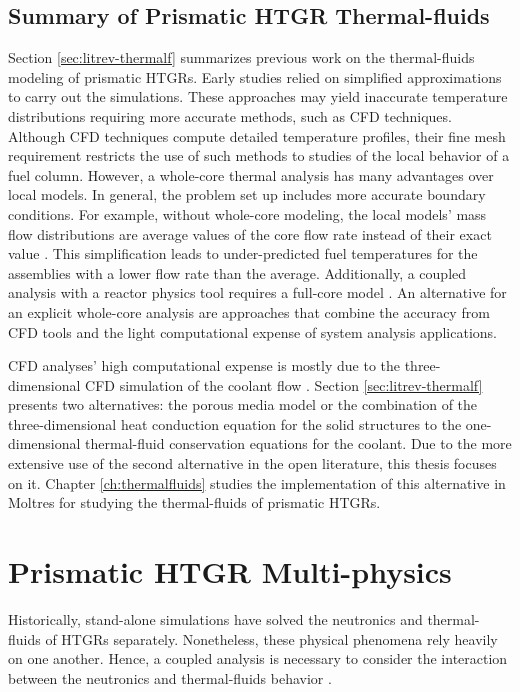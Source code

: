 \subsection{Summary of Prismatic HTGR Thermal-fluids}

Section \ref{sec:litrev-thermalf} summarizes previous work on the thermal-fluids modeling of prismatic HTGRs.
Early studies relied on simplified approximations to carry out the simulations.
These approaches may yield inaccurate temperature distributions requiring more accurate methods, such as CFD techniques.
Although CFD techniques compute detailed temperature profiles, their fine mesh requirement restricts the use of such methods to studies of the local behavior of a fuel column.
However, a whole-core thermal analysis has many advantages over local models.
In general, the problem set up includes more accurate boundary conditions.
For example, without whole-core modeling, the local models' mass flow distributions are average values of the core flow rate instead of their exact value \cite{huning_novel_2016}.
This simplification leads to under-predicted fuel temperatures for the assemblies with a lower flow rate than the average.
Additionally, a coupled analysis with a reactor physics tool requires a full-core model \cite{tak_practical_2012}.
An alternative for an explicit whole-core analysis are approaches that combine the accuracy from CFD tools and the light computational expense of system analysis applications.

CFD analyses' high computational expense is mostly due to the three-dimensional CFD simulation of the coolant flow \cite{travis_thermalhydraulics_2013}.
Section \ref{sec:litrev-thermalf} presents two alternatives: the porous media model or the combination of the three-dimensional heat conduction equation for the solid structures to the one-dimensional thermal-fluid conservation equations for the coolant.
Due to the more extensive use of the second alternative in the open literature, this thesis focuses on it.
Chapter \ref{ch:thermalfluids} studies the implementation of this alternative in Moltres for studying the thermal-fluids of prismatic HTGRs.

\section{Prismatic HTGR Multi-physics}
\label{sec:litreview-multi}

Historically, stand-alone simulations have solved the neutronics and thermal-fluids of HTGRs separately.
Nonetheless, these physical phenomena rely heavily on one another.
Hence, a coupled analysis is necessary to consider the interaction between the neutronics and thermal-fluids behavior \cite{tak_cappgamma_2016}.

